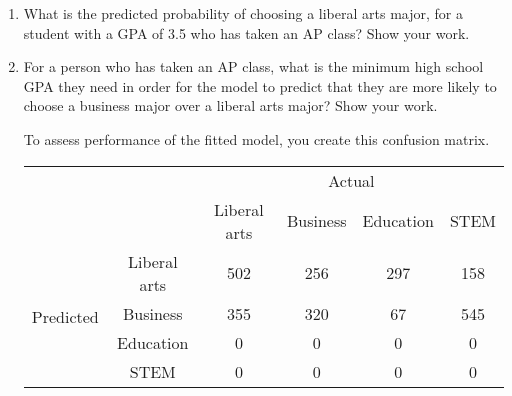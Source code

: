 \documentclass[11pt]{article}
\begin{document}
\begin{enumerate}

\textbf{Model 1} 

\begin{verbatim}
Coefficients:
           (Intercept)  APYes       GPA 
Business    -3.77       0.74       0.95   
Education   -4.36       1.08       0.74
STEM        -5.48       1.79       1.03

Residual Deviance: 23.86116 
\end{verbatim}

\rule{\textwidth}{1pt}

\item What is the predicted probability of choosing a liberal arts major, for a student with a GPA of 3.5 who has taken an AP class? Show your work.

\vspace{6cm}

\item For a person who has taken an AP class, what is the minimum high school GPA they need in order for the model to predict that they are more likely to choose a business major over a liberal arts major? Show your work. 


\pagebreak

To assess performance of the fitted model, you create this confusion matrix.

\begin{table}[]
\centering
\begin{tabular}{|cc|cccc|}
\hline
\multicolumn{2}{|c|}{\multirow{2}{*}{}}                         & \multicolumn{4}{c|}{Actual}                                                                               \\ \cline{3-6} 
\multicolumn{2}{|c|}{}                                          & \multicolumn{1}{c|}{Liberal arts} & \multicolumn{1}{c|}{Business} & \multicolumn{1}{c|}{Education} & STEM \\ \hline
\multicolumn{1}{|c|}{\multirow{4}{*}{Predicted}} & Liberal arts & \multicolumn{1}{c|}{502}          & \multicolumn{1}{c|}{256}      & \multicolumn{1}{c|}{297}       & 158  \\ \cline{2-6} 
\multicolumn{1}{|c|}{}                           & Business     & \multicolumn{1}{c|}{355}          & \multicolumn{1}{c|}{320}      & \multicolumn{1}{c|}{67}        & 545  \\ \cline{2-6} 
\multicolumn{1}{|c|}{}                           & Education    & \multicolumn{1}{c|}{0}            & \multicolumn{1}{c|}{0}        & \multicolumn{1}{c|}{0}         & 0    \\ \cline{2-6} 
\multicolumn{1}{|c|}{}                           & STEM         & \multicolumn{1}{c|}{0}            & \multicolumn{1}{c|}{0}        & \multicolumn{1}{c|}{0}         & 0    \\ \hline
\end{tabular}
\end{table}


\end{enumerate}
\end{document}
